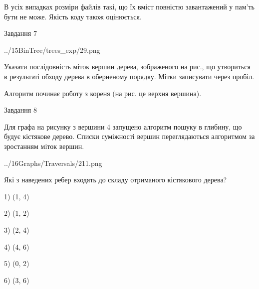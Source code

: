 \documentclass[12pt, ukrainian]{article}
\begin{document}
{В усіх випадках розміри файлів такі, що їх вміст повністю завантажений у пам'ть бути не може. Якість коду також оцінюється.



\vspace{10mm}\par

\newpage
\begin{minipage}[t]{9.7cm}
               
{\begin{center}Завдання {7}\end{center}}
\vspace{-4mm}

\begin{center}
	{../15BinTree/trees_exp/29.png}
\end{center}
Указати послідовність міток вершин дерева, зображеного на рис., що утвориться в результаті обходу дерева в оберненому порядку. Мітки записувати через пробіл.\par Алгоритм починає роботу з кореня (на рис. це верхня вершина).\par

\end{minipage}
\vline \hspace{8mm}
\begin{minipage}[t]{8.0cm}
               
{\begin{center}Завдання {8}\end{center}}
\vspace{-4mm}
Для графа на рисунку з вершини 4 запущено алгоритм пошуку в глибину, що будує кістякове дерево. Списки суміжності вершин переглядаються алгоритмом за зростанням міток вершин.\par
\begin{center}
	{../16Graphs/Traversals/211.png}
\end{center}
\par Які з наведених ребер входять до складу отриманого кістякового дерева?\par
1) (1, 4)\par
2) (1, 2)\par
3) (2, 4)\par
4) (4, 6)\par
5) (0, 2)\par
6) (3, 6)\par
{\vskip 15pt} \par


\end{minipage}}
\end{document}

